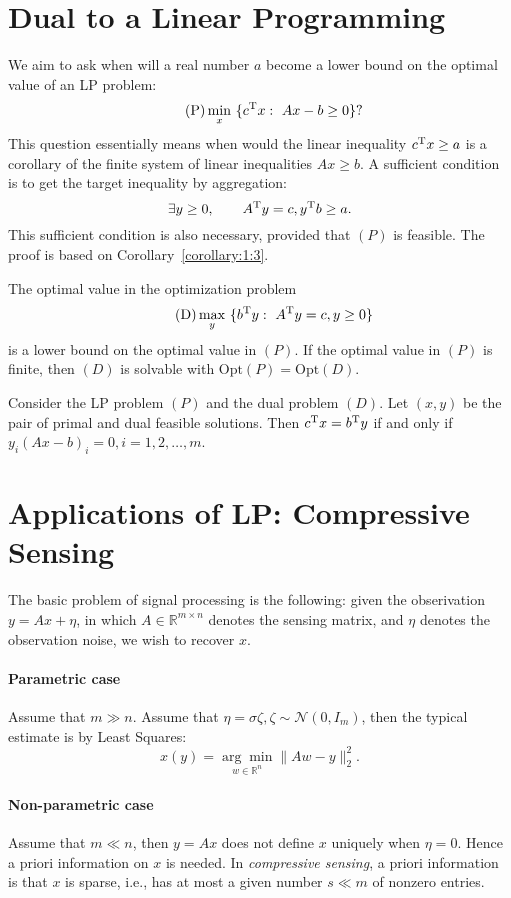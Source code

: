 \section{Dual to a Linear Programming}
We aim to ask when will a real number $a$ become a lower bound on the optimal value of an LP problem:
\begin{equation}
\tag{P}
\min_{x}~\{c^{\mathrm T} x:~Ax-b\ge0\}?
\end{equation}
This question essentially means when would the linear inequality $c^{\mathrm T} x\ge a$ is a corollary of the finite system of linear inequalities $Ax\ge b$.
A sufficient condition is to get the target inequality by aggregation:
\[
\exists y\ge0,\qquad
A^{\mathrm T} y=c, y^{\mathrm T} b\ge a.
\]
This sufficient condition is also necessary, provided that $(P)$ is feasible.
The proof is based on Corollary~\ref{corollary:1:3}.
\begin{theorem}
The optimal value in the optimization problem
\begin{equation}
\tag{D}
\max_{y}~\{b^{\mathrm T} y:~A^{\mathrm T} y=c, y\ge0\}
\end{equation}
is a lower bound on the optimal value in $(P)$.
If the optimal value in $(P)$ is finite, then $(D)$ is solvable with $\text{Opt}(P)=\text{Opt}(D)$.
\end{theorem}
\begin{corollary}
Consider the LP problem $(P)$ and the dual problem $(D)$. 
Let $(x,y)$ be the pair of primal and dual feasible solutions. Then $c^{\mathrm T} x=b^{\mathrm T} y$ if and only if $y_i(Ax-b)_i=0, i=1,2,\ldots,m$.
\end{corollary}

\section{Applications of LP: Compressive Sensing}
The basic problem of signal processing is the following:
given the obserivation $y=Ax+\eta$, in which $A\in\mathbb{R}^{m\times n}$ denotes the sensing matrix, and $\eta$ denotes the observation noise, we wish to recover $x$.

\paragraph{Parametric case}
Assume that $m\gg n$. Assume that $\eta=\sigma\zeta, \zeta\sim\mathcal{N}(0,I_m)$, then the typical estimate is by Least Squares:
\[
\hat{x}(y)=\underset{w\in\mathbb{R}^n}{\arg\min}\|Aw-y\|_2^2.
\]
\paragraph{Non-parametric case}
Assume that $m\ll n$, then $y=Ax$ does not define $x$ uniquely when $\eta=0$.
Hence a priori information on $x$ is needed.
In \emph{compressive sensing}, a priori information is that $x$ is sparse, i.e., has at most a given number $s\ll m$ of nonzero entries.


